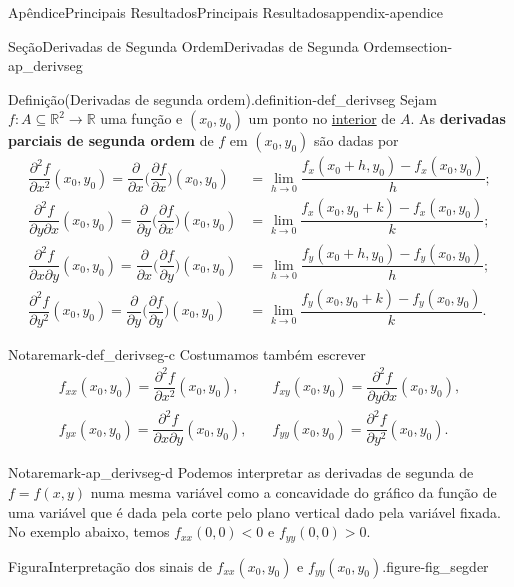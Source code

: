\documentclass[oneside,10pt,]{book}
\newcommand{\terminology}[1]{\textbf{#1}}
\numberwithin{equation}{section}
\newcommand{\R}{\mathbb R}
\begin{document}
\begin{appendixptx}{Apêndice}{Principais Resultados}{}{Principais Resultados}{}{}{appendix-apendice}
\begin{sectionptx}{Seção}{Derivadas de Segunda Ordem}{}{Derivadas de Segunda Ordem}{}{}{section-ap_derivseg}
\begin{definition}{Definição}{(Derivadas de segunda ordem).}{definition-def_derivseg}%
Sejam \(f\colon A\subseteq\R^2\to\R\) uma função e \((x_0,y_0)\) um ponto no \href{https://pt.wikipedia.org/wiki/Interior_(topologia)}{interior}\footnotemark{} de \(A\). As \terminology{derivadas parciais de segunda ordem} de \(f\) em \((x_0,y_0)\) são dadas por%
\begin{align*}
\dfrac{\partial^2 f}{\partial
x^2}(x_0,y_0)=\dfrac{\partial}{\partial x}\Big(\dfrac{\partial
f}{\partial x}\big)(x_0,y_0)&=\lim\limits_{h\to
0}\dfrac{f_x(x_0+h,y_0)-f_x(x_0,y_0)}{h};\\
\dfrac{\partial^2 f}{\partial
y\partial x}(x_0,y_0)=\dfrac{\partial}{\partial y}\Big(\dfrac{\partial
f}{\partial x}\big)(x_0,y_0)&=\lim\limits_{k\to
0}\dfrac{f_x(x_0,y_0+k)-f_x(x_0,y_0)}{k};\\
\dfrac{\partial^2 f}{\partial
x\partial y}(x_0,y_0)=\dfrac{\partial}{\partial x}\Big(\dfrac{\partial
f}{\partial y}\big)(x_0,y_0)&=\lim\limits_{h\to
0}\dfrac{f_y(x_0+h,y_0)-f_y(x_0,y_0)}{h};\\
\dfrac{\partial^2 f}{\partial
y^2}(x_0,y_0)=\dfrac{\partial}{\partial y}\Big(\dfrac{\partial
f}{\partial y}\big)(x_0,y_0)&=\lim\limits_{k\to
0}\dfrac{f_y(x_0,y_0+k)-f_y(x_0,y_0)}{k}.
\end{align*}
%
\begin{remark}{Nota}{}{remark-def_derivseg-c}%
Costumamos também escrever%
\begin{align*}
f_{xx}(x_0,y_0)=\dfrac{\partial^2 f}{\partial x^2}(x_0,y_0),&
\quad f_{xy}(x_0,y_0)=\dfrac{\partial^2 f}{\partial y\partial
x}(x_0,y_0),\\
f_{yx}(x_0,y_0)=\dfrac{\partial^2 f}{\partial x\partial
y}(x_0,y_0),&
\quad f_{yy}(x_0,y_0)=\dfrac{\partial^2 f}{\partial y^2}(x_0,y_0).
\end{align*}
\end{remark}
\end{definition}
%
\begin{remark}{Nota}{}{remark-ap_derivseg-d}%
Podemos interpretar as derivadas de segunda de \(f=f(x,y)\) numa mesma variável como a concavidade do gráfico da função de uma variável que é dada pela corte pelo plano vertical dado pela variável fixada. No exemplo abaixo, temos \(f_{xx}(0,0)<0\) e \(f_{yy}(0,0)>0\). \begin{figureptx}{Figura}{Interpretação dos sinais de \(f_{xx}(x_0,y_0)\) e \(f_{yy}(x_0,y_0)\).}{figure-fig_segder}{}%

\end{figureptx}
\end{remark}
\end{sectionptx}
\end{appendixptx}
\end{document}
